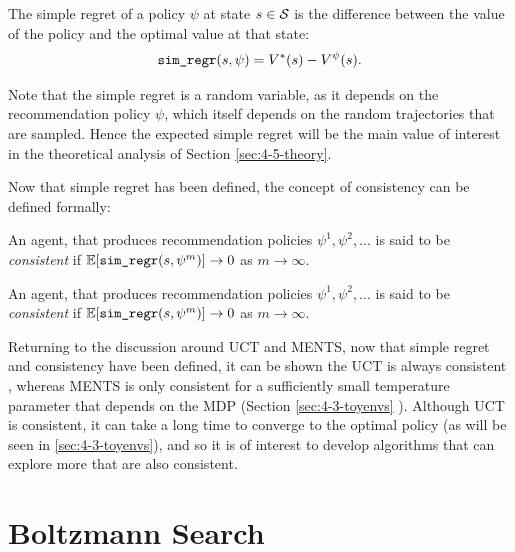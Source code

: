         \begin{defn}
            The \textnormal{simple regret} of a policy $\psi$ at state $s\in\mathcal{S}$ is the difference between the value of the policy and the optimal value at that state:
            \begin{align}
                {\textnormal{\texttt{sim\_regr}}}(s,\psi) = V^*(s)-V^{\psi}(s). \label{eq:4:simple_regret}
            \end{align}
        \end{defn}

        Note that the simple regret is a random variable, as it depends on the recommendation policy $\psi$, which itself depends on the random trajectories that are sampled. Hence the expected simple regret will be the main value of interest in the theoretical analysis of Section \ref{sec:4-5-theory}.

        Now that simple regret has been defined, the concept of consistency can be defined formally:

        \begin{defn}
            An agent, that produces recommendation policies $\psi^1,\psi^2,...$ is said to be \textit{consistent} if $\mathbb{E}[{\textnormal{\texttt{sim\_regr}}}(s,\psi^m)] \rightarrow 0$ as $m\rightarrow \infty$.
        \end{defn}
        An agent, that produces recommendation policies $\psi^1,\psi^2,...$ is said to be \textit{consistent} if $\mathbb{E}[{\textnormal{\texttt{sim\_regr}}}(s,\psi^m)] \rightarrow 0$ as $m\rightarrow \infty$.

        Returning to the discussion around UCT and MENTS, now that simple regret and consistency have been defined, it can be shown the UCT is always consistent , whereas MENTS is only consistent for a sufficiently small temperature parameter that depends on the MDP (Section \ref{sec:4-3-toyenvs} ). Although UCT is consistent, it can take a long time to converge to the optimal policy (as will be seen in \ref{sec:4-3-toyenvs}), and so it is of interest to develop algorithms that can explore more that are also consistent.
    










\section{Boltzmann Search}
\label{sec:4-2-boltzmannsearch}

